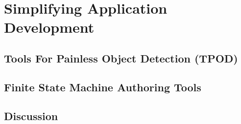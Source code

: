 \chapter{Simplifying Application Development}
\section{Tools For Painless Object Detection (TPOD)}
\section{Finite State Machine Authoring Tools}
\section{Discussion}
